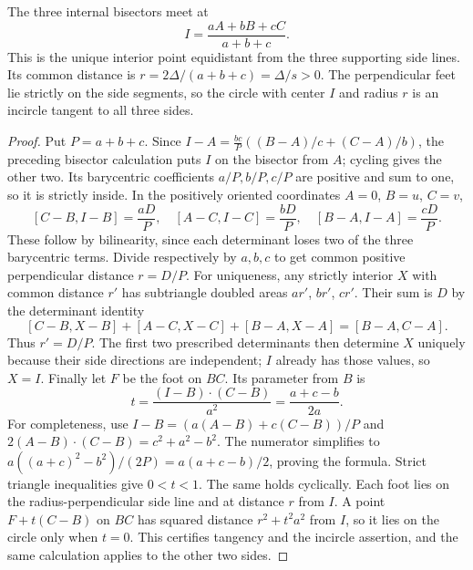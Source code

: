 \begin{theorem}
\label{tri:incenter}
The three internal bisectors meet at
\[
 I=\frac{aA+bB+cC}{a+b+c}.
\]
This is the unique interior point equidistant from the three supporting
side lines.  Its common distance is
$r=2\Delta/(a+b+c)=\Delta/s>0$.
The perpendicular feet lie strictly on the side segments, so the circle
with center $I$ and radius $r$ is an incircle tangent to all three sides.
\end{theorem}
\begin{proof}
Put $P=a+b+c$.  Since
$I-A=\frac{bc}{P}((B-A)/c+(C-A)/b)$,
the preceding bisector calculation puts $I$ on the bisector from $A$;
cycling gives the other two.  Its barycentric coefficients $a/P,b/P,c/P$
are positive and sum to one, so it is strictly inside.
In the positively oriented coordinates $A=0$, $B=u$, $C=v$,
\[
 [C-B,I-B]=\frac{aD}{P},\quad
 [A-C,I-C]=\frac{bD}{P},\quad
 [B-A,I-A]=\frac{cD}{P}.
\]
These follow by bilinearity, since each determinant loses two of the
three barycentric terms.  Divide respectively by $a,b,c$ to get common
positive perpendicular distance $r=D/P$.
For uniqueness, any strictly interior $X$ with common distance $r'$ has
subtriangle doubled areas $ar'$, $br'$, $cr'$.  Their sum is $D$ by the
determinant identity
\[
 [C-B,X-B]+[A-C,X-C]+[B-A,X-A]=[B-A,C-A].
\]
Thus $r'=D/P$.  The first two prescribed determinants then determine
$X$ uniquely because their side directions are independent; $I$ already
has those values, so $X=I$.
Finally let $F$ be the foot on $BC$.  Its parameter from $B$ is
\[
 t=\frac{(I-B)\mathbin{\cdot}(C-B)}{a^2}
   =\frac{a+c-b}{2a}.
\]
For completeness, use
$I-B=(a(A-B)+c(C-B))/P$ and
$2(A-B)\mathbin{\cdot}(C-B)=c^2+a^2-b^2$.
The numerator simplifies to
$a((a+c)^2-b^2)/(2P)=a(a+c-b)/2$, proving the formula.
Strict triangle inequalities give $0<t<1$.  The same holds cyclically.
Each foot lies on the radius-perpendicular side line and at distance $r$
from $I$.  A point $F+t(C-B)$ on $BC$ has squared distance
$r^2+t^2a^2$ from $I$, so it lies on the circle only when $t=0$.
This certifies tangency and the incircle assertion, and the same
calculation applies to the other two sides.
\end{proof}

